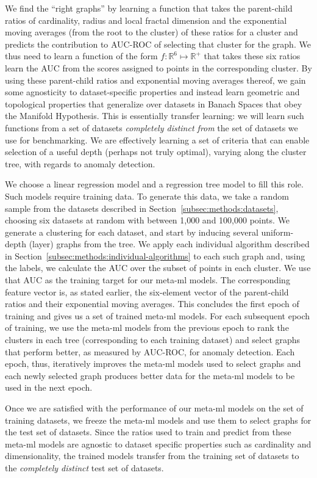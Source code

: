 We find the ``right graphs'' by learning a function that takes the parent-child ratios of cardinality, radius and local fractal dimension and the exponential moving averages (from the root to the cluster) of these ratios for a cluster and predicts the contribution to AUC-ROC of selecting that cluster for the graph.
We thus need to learn a function of the form $f: \mathbb{R}^6 \mapsto \mathbb{R}^+$ that takes these six ratios learn the AUC from the scores assigned to points in the corresponding cluster.
By using these parent-child ratios and exponential moving averages thereof, we gain some agnosticity to dataset-specific properties and instead learn geometric and topological properties that generalize over datasets in Banach Spaces that obey the Manifold Hypothesis.
This is essentially transfer learning: we will learn such functions from a set of datasets \emph{completely distinct from} the set of datasets we use for benchmarking.
We are effectively learning a set of criteria that can enable selection of a useful depth (perhaps not truly optimal), varying along the cluster tree, with regards to anomaly detection.

We choose a linear regression model and a regression tree model to fill this role.
Such models require training data.
To generate this data, we take a random sample from the datasets described in Section~\ref{subsec:methods:datasets}, choosing six datasets at random with between 1,000 and 100,000 points.
We generate a clustering for each dataset, and start by inducing several uniform-depth (layer) graphs from the tree.
We apply each individual algorithm described in Section~\ref{subsec:methods:individual-algorithms} to each such graph and, using the labels, we calculate the AUC over the subset of points in each cluster.
We use that AUC as the training target for our meta-ml models.
The corresponding feature vector is, as stated earlier, the six-element vector of the parent-child ratios and their exponential moving averages.
This concludes the first epoch of training and gives us a set of trained meta-ml models.
For each subsequent epoch of training, we use the meta-ml models from the previous epoch to rank the clusters in each tree (corresponding to each training dataset) and select graphs that perform better, as measured by AUC-ROC, for anomaly detection.
Each epoch, thus, iteratively improves the meta-ml models used to select graphs and each newly selected graph produces better data for the meta-ml models to be used in the next epoch.

Once we are satisfied with the performance of our meta-ml models on the set of training datasets, we freeze the meta-ml models and use them to select graphs for the test set of datasets.
Since the ratios used to train and predict from these meta-ml models are agnostic to dataset specific properties such as cardinality and dimensionality, the trained models transfer from the training set of datasets to the \textit{completely distinct} test set of datasets.

